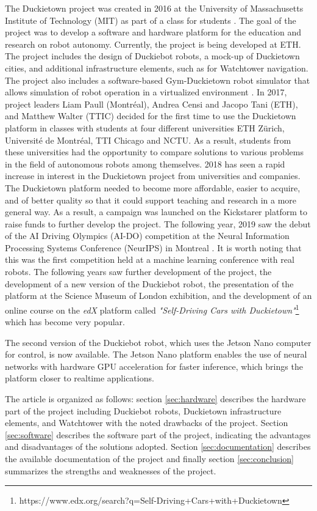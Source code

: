 \documentclass[conference]{IEEEtran}
\begin{document}
The Duckietown project was created in 2016 at the University of Massachusetts Institute of Technology (MIT) as part of a class for students \cite{paull2017duckietown}. The goal of the project was to develop a software and hardware platform for the education and research on robot autonomy. Currently, the project is being developed at ETH. The project includes the design of Duckiebot robots, a mock-up of Duckietown cities, and additional infrastructure elements, such as for Watchtower navigation. The project also includes a software-based Gym-Duckietown robot simulator that allows simulation of robot operation in a virtualized environment \cite{gym_duckietown}. 
In 2017, project leaders Liam Paull (Montréal), Andrea Censi and Jacopo Tani (ETH), and Matthew Walter (TTIC) decided for the first time to use the Duckietown platform in classes with students at four different universities ETH Zürich, Université de Montréal, TTI Chicago and NCTU. As a result, students from these universities had the opportunity to compare solutions to various problems in the field of autonomous robots among themselves. 2018 has seen a rapid increase in interest in the Duckietown project from universities and companies. The Duckietown platform needed to become more affordable, easier to acquire, and of better quality so that it could support teaching and research in a more general way. As a result, a campaign was launched on the Kickstarer platform to raise funds to further develop the project. The following year, 2019 saw the debut of the AI Driving Olympics (AI-DO) competition at the Neural Information Processing Systems Conference (NeurIPS) in Montreal \cite{censi2019ai}. It is worth noting that this was the first competition held at a machine learning conference with real robots. The following years saw further development of the project, the development of a new version of the Duckiebot robot, the presentation of the platform at the Science Museum of London exhibition, and the development of an online course on the \emph{edX} platform called \emph{"Self-Driving Cars with Duckietown"}\footnote{https://www.edx.org/search?q=Self-Driving+Cars+with+Duckietown} which has become very popular.

The second version of the Duckiebot robot, which uses the Jetson Nano computer for control, is now available. The Jetson Nano platform enables the use of neural networks with hardware GPU acceleration for faster inference, which brings the platform closer to realtime applications.

The article is organized as follows: section \ref{sec:hardware} describes the hardware part of the project including Duckiebot robots, Duckietown infrastructure elements, and Watchtower with the noted drawbacks of the project. Section \ref{sec:software} describes the software part of the project, indicating the advantages and disadvantages of the solutions adopted.
Section \ref{sec:documentation} describes the available documentation of the project and finally section \ref{sec:conclusion} summarizes the strengths and weaknesses of the project.
\end{document}
